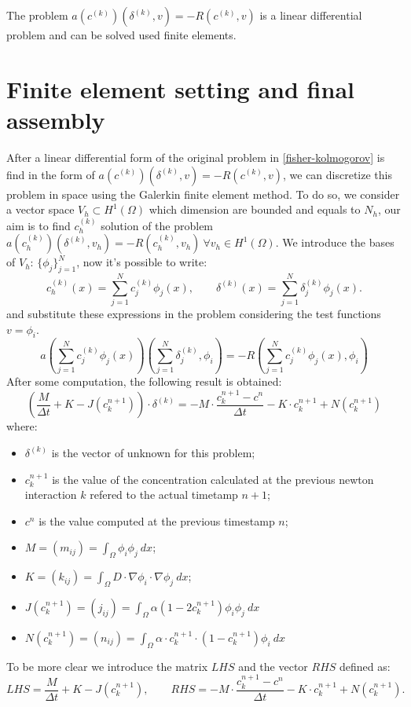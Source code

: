 \documentclass[12pt, a4paper, twoside, openright]{report}
\begin{document}
The problem $a(c^{(k)})(\delta^{(k)}, v) = -R(c^{(k)}, v)$ is a linear differential problem and can be solved used finite elements.

 \section{Finite element setting and final assembly}
  After a linear differential form of the original problem in \autoref{fisher-kolmogorov} is find in the form of $a(c^{(k)})(\delta^{(k)}, v) = -R(c^{(k)}, v)$, we can discretize this problem in space using the Galerkin finite element method. To do so, we consider a vector space  $V_h \subset H^1(\Omega)$ which dimension are bounded and equals to $N_h$, our aim is to find $c_h^{(k)}$ solution of the problem $a(c_h^{(k)})(\delta^{(k)}, v_h) = -R(c_h^{(k)}, v_h) \ \forall v_h \in H^1(\Omega)$. We introduce the bases of $V_h$: \( \{\phi_j\}_{j=1}^N \), now it's possible to write:
    $$c_h^{(k)}(x) = \sum_{j=1}^N c_j^{(k)} \phi_j(x), \qquad \delta^{(k)}(x) = \sum_{j=1}^N \delta_j^{(k)} \phi_j(x).$$
 and substitute these expressions in the problem considering the test functions $v=\phi_i$.
\begin{equation}
    a \left ( \sum_{j=1}^N c_j^{(k)} \phi_j(x) \right ) \left (\sum_{j=1}^N \delta_j^{(k)}, \phi_i \right ) = -R \left (\sum_{j=1}^N c_j^{(k)} \phi_j(x), \phi_i \right )
\end{equation}
After some computation, the following result is obtained:
    \begin{equation}
        \label{linear_system}
        \left ( \frac{M}{\Delta t}+K-J \left (c_k^{n+1} \right )\right ) \cdot \delta^{(k)}=-M\cdot \frac{c_k^{n+1}-c^{n}}{\Delta t} - K \cdot c_k^{n+1} + N \left (c_k^{n+1} \right )
    \end{equation}
where:
\begin{itemize}
    \item $\delta^{(k)}$ is the vector of unknown for this problem;
    \item $c_k^{n+1}$ is the value of the concentration calculated at the previous newton interaction $k$ refered to the actual timetamp $n+1$;
    \item $c^{n}$ is the value computed at the previous timestamp $n$;
    \item $M=(m_{ij})=\int_{\Omega} \phi_i\phi_j\ dx$;
    \item $K=(k_{ij})=\int_{\Omega} D \cdot \nabla\phi_i \cdot \nabla\phi_j\ dx$;
    \item $ J \left (c_k^{n+1} \right ) = (j_{ij}) =\int_{\Omega}\alpha (1-2c_k^{n+1})\phi_i \phi_j \ dx$
    \item $N \left (c_k^{n+1} \right )= (n_{ij})=\int_\Omega \alpha \cdot c_k^{n+1} \cdot (1-c_k^{n+1}) \phi_i \ dx$
\end{itemize}
To be more clear we introduce the matrix $LHS$ and the vector $RHS$ defined as:
$$LHS=\frac{M}{\Delta t}+K-J \left (c_k^{n+1} \right ), \qquad RHS=-M\cdot \frac{c_k^{n+1}-c^{n}}{\Delta t} - K \cdot c_k^{n+1} + N \left (c_k^{n+1} \right ).$$
\end{document}
